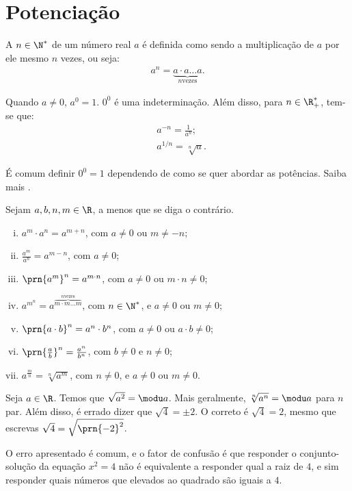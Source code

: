 \section{Potenciação}

\begin{definition}
A  $n \in \N^*$ de um número real $a$ é definida
como sendo a multiplicação de $a$ por ele mesmo $n$ vezes, ou seja:
%
\begin{align*}
a^n = \underbrace{a \cdot a  \dots  a}_{n \text{
vezes}}.
\end{align*}
\end{definition}

\begin{definition}
Quando $a \neq 0$, $a^0 = 1$. $0^0$ é uma indeterminação. Além disso, para $n \in \R^*_+$, tem-se que: 
\begin{align*}
&a^{-n} = \frac{1}{a^n}; \\
&a^{1/n} = \sqrt[n] a.
\end{align*}
\end{definition}

É comum definir $0^0 =1$ dependendo de como se quer abordar as potências. Saiba mais .

\begin{proposition}[Propriedades]
Sejam $a, b, n, m \in \R$, a menos que se diga o contrário.
\begin{enumerate}[i.]
  \item $a^m \cdot a^n = a^{m+n}$, com $a \ne 0$ ou $m \ne -n$;
  \item $\frac {a^m}{a^n} = a^{m-n}$, com $a \ne 0$;
  \item $\prn{a^m}^n = a^{m\cdot n}$, com $a \ne 0$ ou $m\cdot n \ne 0$;
  \item $a^{m^n} = a^{\overbrace{m \cdot m  \dots  m}^{n \text{
  vezes}}}$, com $n \in \N^*$, e $a \ne 0$ ou $m \ne 0$;
  \item $\prn{a \cdot b }^n= a^n \cdot b^n$, com $a \ne 0$ ou $a \cdot b \ne 0$;
  \item $\prn{\frac a b }^n = \frac {a^n} {b^n}$, com $b \ne 0$ e $n \ne 0$; 
  \item $a^{\frac m n} = \sqrt[n]{a^m}$, com $n \neq 0$, e $a \ne 0$ ou $m \ne 0$.
\end{enumerate}
\end{proposition}

\begin{remark}
Seja $a \in \R$. Temos que $\sqrt{a^2} = \modu a$. Mais geralmente, $\sqrt[n] {a^n} = \modu a$ para $n$ par. Além disso, é errado dizer que $\sqrt 4 = \pm 2$. O correto é $\sqrt 4 = 2$, mesmo que escrevas $\sqrt 4 = \sqrt{\prn {-2}^2}$. 

O erro apresentado é comum, e o fator de confusão é que responder o conjunto-solução da equação $x^2=4$ não é equivalente a responder qual a raiz de $4$, e sim responder quais números que elevados ao quadrado são iguais a $4$.
\end{remark}

